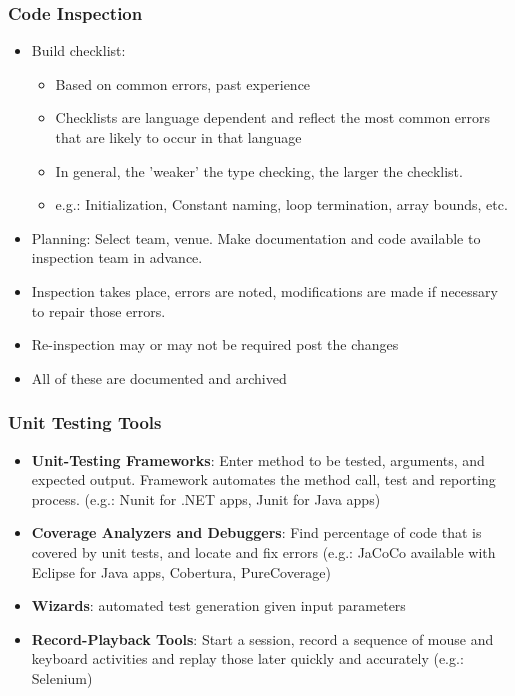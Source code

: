 \documentclass{article}
\begin{document}
\subsubsection{Code Inspection}
\begin{itemize}
    \item Build checklist:
    \begin{itemize}
        \item Based on common errors, past experience
        
        \item Checklists are language dependent and reflect the most common errors that are likely to occur in that language
        
        \item In general, the 'weaker' the type checking, the larger the checklist.
        
        \item e.g.: Initialization, Constant naming, loop termination, array bounds, etc.
    \end{itemize}
    
    \item Planning: Select team, venue. Make documentation and code available to inspection team in advance.
    
    \item Inspection takes place, errors are noted, modifications are made if necessary to repair those errors. 
    
    \item Re-inspection may or may not be required post the changes
    
    \item All of these are documented and archived
\end{itemize}

\subsubsection{Unit Testing Tools}
\begin{itemize}
    \item \textbf{Unit-Testing Frameworks}: Enter method to be tested, arguments, and expected output. Framework automates the method call, test and reporting process. (e.g.: Nunit for .NET apps, Junit for Java apps)
    
    \item \textbf{Coverage Analyzers and Debuggers}: Find percentage of code that is covered by unit tests, and locate and fix errors (e.g.: JaCoCo available with Eclipse for Java apps, Cobertura, PureCoverage)
    
    \item \textbf{Wizards}: automated test generation given input parameters 
    
    \item \textbf{Record-Playback Tools}: Start a session, record a sequence of mouse and keyboard activities and replay those later quickly and accurately (e.g.: Selenium)
\end{itemize}
\end{document}
